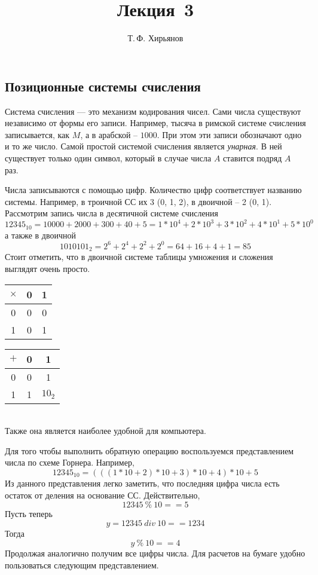 \documentclass[a4paper, fleqn]{article}
\title{Лекция \textnumero\,3}
\author{Т.\,Ф. Хирьянов}
\date{}
\begin{document}
	\maketitle
	
	\subsection*{Позиционные системы счисления}
	
	Система счисления --- это механизм кодирования чисел. Сами числа существуют независимо от формы его записи. 
	Например, тысяча в римской системе счисления записывается, как $M$, а в арабской -- $1000$. При этом эти записи обозначают одно и то же число. 
	Самой простой системой счисления является \emph{унарная}.
	В ней существует только один символ, который в случае числа $A$ ставится подряд $A$ раз.
	
	Числа записываются с помощью цифр. Количество цифр соответствует названию системы. Например, в троичной СС их 3 (0, 1, 2), в двоичной -- 2 (0, 1).
	Рассмотрим запись числа в  десятичной системе счисления 
	\[12345_{10} = 10000+2000+300+40+5 = 1*10^{4} + 2*10^3+3*10^2 + 4*10^1 + 5*10^0\]
	а также в двоичной
	\[1010101_2 = 2^6+2^4+2^2+2^0 = 64+16+4+1 = 85\]
	Стоит отметить, что в двоичной системе таблицы умножения и сложения выглядят очень просто.
	\qquad { } \\ 
	\begin{tabular}{c|cc}
		$\times$ & 0 & 1 \\
		\hline
		0 & 0 & 0 \\
		1 & 0 & 1
	\end{tabular}\qquad
	\begin{tabular}{c|cc}
		$+$ & 0 & 1 \\
		\hline
		0 & 0 & 1 \\
		1 & 1 & $10_2$
	\end{tabular}
	\\
	Также она является  наиболее удобной для компьютера.
	
	Для того чтобы выполнить обратную операцию воспользуемся представлением числа по схеме Горнера. Например, 
	\[12345_{10}= (((1*10+2)*10+3)*10+4)*10+5\] 
	Из данного представления легко заметить, что последняя цифра числа есть остаток от деления на основание СС. Действительно, 
	\[12345~\%~10 == 5\]
	Пусть теперь 
	\[y = 12345~div~10 == 1234\]
	Тогда 
	\[y~\%~10 == 4\]
	Продолжая аналогично получим все цифры числа. Для расчетов на бумаге удобно пользоваться следующим представлением. 
		
\end{document}
